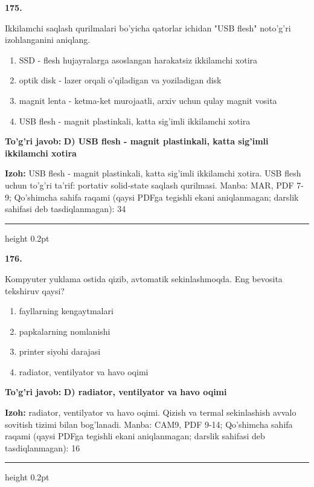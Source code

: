 \documentclass[10pt,a4paper]{article}
\begin{document}
{\bfseries\sffamily\color{ink} 175.}
\par
Ikkilamchi saqlash qurilmalari bo'yicha qatorlar ichidan "USB flesh" noto'g'ri izohlanganini aniqlang.
\begin{enumerate}[label=\Alph*),leftmargin=9mm]
\item SSD - flesh hujayralarga asoslangan harakatsiz ikkilamchi xotira
\item optik disk - lazer orqali o'qiladigan va yoziladigan disk
\item magnit lenta - ketma-ket murojaatli, arxiv uchun qulay magnit vosita
\item USB flesh - magnit plastinkali, katta sig'imli ikkilamchi xotira
\end{enumerate}
\begin{tcolorbox}[enhanced,breakable,colback=teal!4,colframe=teal!60!black,boxrule=0.45pt,arc=1.2mm,left=2.7mm,right=2.7mm,top=1.8mm,bottom=1.8mm,before skip=2mm,after skip=2mm]
{\bfseries\sffamily\color{teal}To'g'ri javob:} \textbf{D) USB flesh - magnit plastinkali, katta sig'imli ikkilamchi xotira}
\par\smallskip
{\bfseries Izoh:} USB flesh - magnit plastinkali, katta sig'imli ikkilamchi xotira. USB flesh uchun to'g'ri ta'rif: portativ solid-state saqlash qurilmasi. Manba: MAR, PDF 7-9; Qo'shimcha sahifa raqami (qaysi PDFga tegishli ekani aniqlanmagan; darslik sahifasi deb tasdiqlanmagan): 34
\end{tcolorbox}
\vspace{2mm}\hrule height 0.2pt\vspace{3mm}

{\bfseries\sffamily\color{ink} 176.}
\par
Kompyuter yuklama ostida qizib, avtomatik sekinlashmoqda. Eng bevosita tekshiruv qaysi?
\begin{enumerate}[label=\Alph*),leftmargin=9mm]
\item fayllarning kengaytmalari
\item papkalarning nomlanishi
\item printer siyohi darajasi
\item radiator, ventilyator va havo oqimi
\end{enumerate}
\begin{tcolorbox}[enhanced,breakable,colback=teal!4,colframe=teal!60!black,boxrule=0.45pt,arc=1.2mm,left=2.7mm,right=2.7mm,top=1.8mm,bottom=1.8mm,before skip=2mm,after skip=2mm]
{\bfseries\sffamily\color{teal}To'g'ri javob:} \textbf{D) radiator, ventilyator va havo oqimi}
\par\smallskip
{\bfseries Izoh:} radiator, ventilyator va havo oqimi. Qizish va termal sekinlashish avvalo sovitish tizimi bilan bog'lanadi. Manba: CAM9, PDF 9-14; Qo'shimcha sahifa raqami (qaysi PDFga tegishli ekani aniqlanmagan; darslik sahifasi deb tasdiqlanmagan): 16
\end{tcolorbox}
\vspace{2mm}\hrule height 0.2pt\vspace{3mm}
\end{document}
